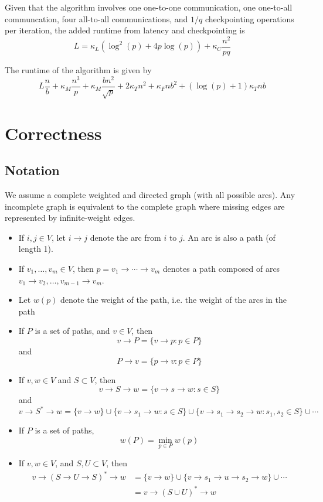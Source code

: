 \documentclass{article} %
\begin{document}
Given that the algorithm involves one one-to-one communication, one
one-to-all communcation, four all-to-all communications, and $1/q$
checkpointing operations per iteration, the added runtime from latency
and checkpointing is
\[
L = \kappa_L(\log^2(p) + 4p\log(p)) + \kappa_C \frac{n^2}{pq}
\]

The runtime of the algorithm is given by
\[
L\frac{n}{b} + \kappa_M \frac{n^3}{p} + \kappa_M \frac{bn^2}{\sqrt{p}} + 2\kappa_T n^2 + \kappa_F nb^2 + (\log(p) + 1)\kappa_T nb
\]


\section{Correctness}

\subsection{Notation}

We assume a complete weighted and directed graph (with all possible
arcs).  Any incomplete graph is equivalent to the complete graph
where missing edges are represented by infinite-weight edges.

\begin{itemize}
\item If $i, j \in V$, let $i \to j$ denote the arc from $i$ to $j$.  An arc is also a path (of length 1).
\item If $v_1, \hdots, v_m \in V$, then $p = v_1\to \cdots \to v_m$  denotes a path composed of arcs $v_1 \to v_2, \hdots, v_{m-1} \to v_m$.
\item Let $w(p)$ denote the weight of the path, i.e. the weight of the arcs in the path
\item If $P$ is a set of paths, and $v \in V$, then
\[
v \to P = \{v \to p: p \in P\}
\]
and
\[
P \to v = \{p \to v: p \in P\}
\]
\item If $v, w \in V$ and $S \subset V$, then
\[ v \to S \to w = \{v \to s \to w: s \in S\}\]
and
\[
v \to S^* \to w = \{v \to w\} \cup \{v \to s_1 \to w: s \in S\} \cup \{v \to s_1 \to s_2 \to w: s_1, s_2 \in S\} \cup \cdots
\]
\item If $P$ is a set of paths,
\[
w(P) = \min_{p \in P} w(p)
\]
\item If $v, w \in V$, and $S, U \subset V$, then
\begin{align*}
v \to (S \to U \to S)^* \to w &= \{v \to w\} \cup \{v \to s_1 \to u \to s_2 \to w\} \cup \cdots\\
&= v \to (S \cup U)^* \to w
\end{align*}
\end{itemize}
\end{document}
